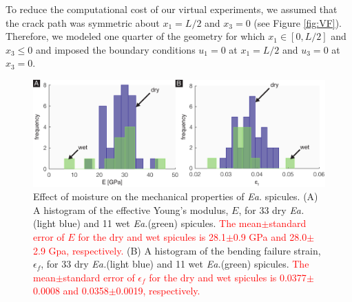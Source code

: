 \documentclass[12pt,onecolumn]{article}
\makeatletter
\newcommand{\EA}{\textit{Ea.\@}\xspace}
\makeatother
\begin{document}
\begin{bibunit}
To reduce the computational cost of our virtual experiments, we assumed that the crack path was symmetric about $x_1 = L/2$ and $x_3 = 0$ (see Figure \ref{fig:VF}). Therefore, we modeled one quarter of the geometry for which $x_1 \in [0,L/2]$ and $x_3\leq 0$ and imposed the boundary conditions $u_1 = 0$ at $x_1 = L/2$ and $u_3 = 0$ at $x_3 = 0$.




 	\begin{figure}[H]
	\centering
	\includegraphics[width=\textwidth]{../Figures/FigureHyd/FigureA3_V1.pdf}
	\caption{Effect of moisture on the mechanical properties of \EA spicules. (A) A histogram of the effective Young's modulus, $E$, for 33 dry \EA (light blue) and 11 wet \EA (green) spicules. \textcolor{red}{The mean$\pm$standard error of $E$ for the dry and wet spicules is 28.1$\pm$0.9 GPa and 28.0$\pm$2.9 Gpa, respectively.} (B) A histogram of the bending failure strain, $\epsilon_f$, for 33 dry \EA (light blue) and 11 wet \EA (green) spicules. \textcolor{red}{The mean$\pm$standard error of $\epsilon_f$ for the dry and wet spicules is 0.0377$\pm$0.0008 and 0.0358$\pm$0.0019, respectively.}}
	\label{fig:hyd}
	\end{figure}
	

\end{bibunit}
\end{document}
